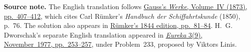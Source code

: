 \par\medskip\begin{small}\noindent\textbf{Source note.} The English translation follows \href{https://gdz.sub.uni-goettingen.de/id/PPN236005081}{Gauss’s \textit{Werke}, Volume~IV (1873), pp.~407--412}, which cites Carl Rümker’s \textit{Handbuch der Schiffahrtskunde} (1850), p.~76. The solution also appears in \href{https://www.e-rara.ch/download/pdf/14097000.pdf}{Rümker’s 1844 edition, pp.~81--84}. H.~G. Dworschak’s separate English translation appeared in \href{https://cms.math.ca/wp-content/uploads/crux-pdfs/Crux_v3n09_Nov.pdf#page=14}{\textit{Eureka} 3(9), November~1977, pp.~253--257}, under Problem~233, proposed by Viktors Linis.\par\end{small}
